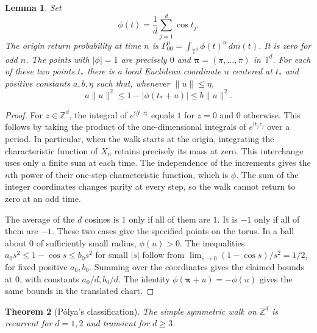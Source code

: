 \documentclass[11pt,oneside,openany]{book}
\theoremstyle{plain}
\newtheorem{theorem}{Theorem}[chapter]
\newtheorem{lemma}[theorem]{Lemma}
\theoremstyle{definition}
\theoremstyle{remark}
\begin{document}
\begin{lemma}\label{p207:lem:lattice-fourier}
Set
\[
 \phi(t)=\frac1d\sum_{j=1}^d\cos t_j .
\]
The origin return probability at time \(n\) is
\(\displaystyle P^n_{00}=\int_{\mathbb T^d}\phi(t)^n\,dm(t)\).
It is zero for odd \(n\). The points with \(\lvert\phi\rvert=1\) are
precisely \(0\) and \(\boldsymbol\pi=(\pi,\ldots,\pi)\) in \(\mathbb T^d\).
For each of these two points \(t_*\) there is a local Euclidean
coordinate \(u\) centered at \(t_*\) and positive constants \(a,b,\eta\)
such that, whenever \(\lVert u\rVert\leq\eta\),
\[
 a\lVert u\rVert^2\leq 1-\lvert\phi(t_*+u)\rvert
                  \leq b\lVert u\rVert^2 .
\]
\end{lemma}

\begin{proof}
For \(z\in\mathbb Z^d\), the integral of
\(e^{\mathrm i\langle t,z\rangle}\) equals \(1\) for \(z=0\) and \(0\)
otherwise. This follows by taking the product of the one-dimensional
integrals of \(e^{\mathrm i t_j z_j}\) over a period. In particular,
when the walk starts at the origin, integrating the characteristic
function of \(X_n\) retains precisely its mass at zero. This
interchange uses only a finite sum at each time. The independence of
the increments gives the \(n\)th power of their one-step characteristic
function, which is \(\phi\). The sum of the integer coordinates
changes parity at every step, so the walk cannot return to zero at an
odd time.

The average of the \(d\) cosines is \(1\) only if all of them are \(1\).
It is \(-1\) only if all of them are \(-1\). These two cases give the
specified points on the torus. In a ball about \(0\) of sufficiently
small radius, \(\phi(u)>0\). The inequalities
\(a_0 s^2\leq 1-\cos s\leq b_0 s^2\) for small \(\lvert s\rvert\)
follow from \(\lim_{s\to0}(1-\cos s)/s^2=1/2\), for fixed positive
\(a_0,b_0\). Summing over the coordinates gives the claimed bounds
at \(0\), with constants \(a_0/d,b_0/d\).
The identity \(\phi(\boldsymbol\pi+u)=-\phi(u)\) gives the same
bounds in the translated chart.
\end{proof}

\begin{theorem}[Pólya's classification]\label{p207:thm:polya}
The simple symmetric walk on \(\mathbb Z^d\) is recurrent for \(d=1,2\)
and transient for \(d\geq3\).
\end{theorem}
\end{document}
